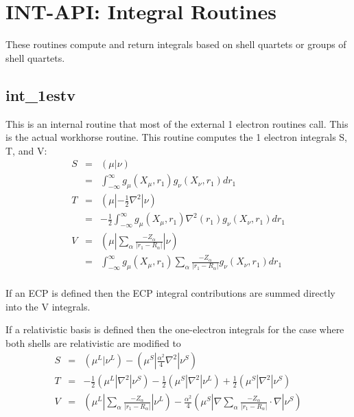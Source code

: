\section{INT-API: Integral Routines} 
These routines compute and return integrals based on shell quartets 
or groups of shell quartets.   
% 
 
\subsection{int\_1estv} 
This is an internal routine that most of the external 1 electron 
routines call.  This is the actual workhorse routine. 
This routine computes the 1 electron integrals S, T, and V: 
\begin{eqnarray*} 
S & = & ({\mu}|{\nu}) \\ 
  & = & \int_{-\infty}^{\infty} g_{\mu}(X_{\mu},r_{1})g_{\nu}(X_{\nu},r_{1})dr_{1} \\ 
T & = & ({\mu}|-\frac{1}{2}\nabla^{2}|{\nu}) \\ 
  & = & -\frac{1}{2}\int_{-\infty}^{\infty}g_{\mu}(X_{\mu},r_{1})\nabla^{2}(r_{1}) 
        g_{\nu}(X_{\nu},r_{1})dr_{1} \\ 
V & = & ({\mu}|\sum_{\alpha}\frac{-Z_{\alpha}}{|r_{1}-R_{\alpha}|}|{\nu}) \\ 
  & = & \int_{-\infty}^{\infty} g_{\mu}(X_{\mu},r_{1})\sum_{\alpha}\frac 
{-Z_{\alpha}}{|r_{1}-R_{\alpha}|}g_{\nu}(X_{\nu},r_{1})dr_{1} \\ 
\end{eqnarray*} 
 
If an ECP is defined then the ECP integral contributions are summed 
directly into the V integrals. 
 
If a relativistic basis is defined then the one-electron integrals 
for the case where both shells are relativistic are modified to 
\begin{eqnarray*} 
S & = & ({\mu^L}|{\nu^L}) 
      - ({\mu^S}|\frac{\alpha^2}{4}{\nabla^{2}}|{\nu^S}) \\ 
T & = & -\frac{1}{2} ({\mu^L}|{\nabla^{2}}|{\nu^S}) 
      -  \frac{1}{2} ({\mu^S}|{\nabla^{2}}|{\nu^L}) 
      +  \frac{1}{2} ({\mu^S}|{\nabla^{2}}|{\nu^S}) \\ 
V & = & ({\mu^L}|\sum_{\alpha}\frac{-Z_{\alpha}}{|r_{1}-R_{\alpha}|}|{\nu^L}) 
    - \frac{\alpha^2}{4} ({\mu^S}|\nabla\sum_{\alpha}\frac{-Z_{\alpha}}{|r_{1}-R_{\alpha}|}\cdot\nabla|{\nu^S}) \\ 
\end{eqnarray*} 
  
